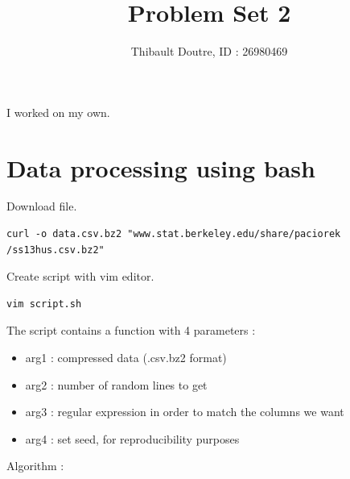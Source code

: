 \documentclass{llncs}\usepackage[]{graphicx}\usepackage[]{color}
\begin{document}
\title{Problem Set 2}
\author{Thibault Doutre, ID : 26980469}
\date{}
\maketitle
\bigbreak
\noindent
I worked on my own.
\section{Data processing using bash}


Download file.
\begin{lstlisting}[frame=single] 
curl -o data.csv.bz2 "www.stat.berkeley.edu/share/paciorek
/ss13hus.csv.bz2"
\end{lstlisting}
Create script with vim editor.
\begin{lstlisting}[frame=single] 
vim script.sh
\end{lstlisting}
The script contains a function with 4 parameters :
\begin{itemize}
\item arg1 : compressed data (.csv.bz2 format)
\item arg2 : number of random lines to get
\item arg3 : regular expression in order to match the columns we want
\item arg4 : set seed, for reproducibility purposes

\end{itemize}
Algorithm :
\end{document}
